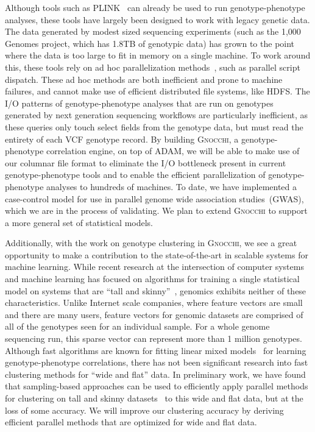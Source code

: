 \documentclass[11pt]{article} %
\begin{document}
Although tools such as \textsc{PLINK}~\cite{purcell07, chang15} can already be used to run
genotype-phenotype analyses, these tools have largely been designed to work with legacy genetic
data. The data generated by modest sized sequencing experiments (such as the 1,000 Genomes project,
which has 1.8TB of genotypic data) has grown to the point where the data is too large to fit in
memory on a single machine. To work around this, these tools rely on ad hoc parallelization
methods~\cite{chang15}, such as parallel script dispatch. These ad hoc methods are both
inefficient and prone to machine failures, and cannot make use of efficient distributed file
systems, like \textsc{HDFS}. The I/O patterns of genotype-phenotype analyses that are run on
genotypes generated by next generation sequencing workflows are particularly inefficient, as
these queries only touch select fields from the genotype data, but must read the entirety of each
VCF genotype record. By building \textsc{Gnocchi}, a genotype-phenotype correlation engine, on top
of \textsc{ADAM}, we will be able to make use of our columnar file format to eliminate the I/O
bottleneck present in current genotype-phenotype tools and to enable the efficient parallelization
of genotype-phenotype analyses to hundreds of machines. To date, we have implemented a case-control
model for use in parallel genome wide association studies~(GWAS), which we are in the process of
validating. We plan to extend \textsc{Gnocchi} to support a more general set of statistical models.

Additionally, with the work on genotype clustering in \textsc{Gnocchi}, we see a great
opportunity to make a contribution to the state-of-the-art in scalable systems for machine
learning. While recent research at the intersection of computer systems and machine learning
has focused on algorithms for training a single statistical model on systems that are ``tall
and skinny''~\cite{meng15, zadeh15}, genomics exhibits neither of these characteristics.
Unlike Internet scale companies, where feature vectors are small and there are many users,
feature vectors for genomic datasets are comprised of all of the genotypes seen for an
individual sample. For a whole genome sequencing run, this sparse vector can represent more
than 1 million genotypes. Although fast algorithms are known for fitting linear mixed
models~\cite{lippert11} for learning genotype-phenotype correlations, there has not been
significant research into fast clustering methods for ``wide and flat'' data. In preliminary
work, we have found that sampling-based approaches can be used to efficiently apply parallel
methods for clustering on tall and skinny datasets~\cite{bahmani12, meng15} to this wide and
flat data, but at the loss of some accuracy. We will improve our clustering accuracy by deriving
efficient parallel methods that are optimized for wide and flat data.
\end{document}
